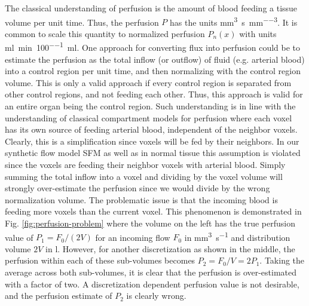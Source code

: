 \documentclass[paper=a4, fontsize=11pt,parskip=half,headings=small]{scrartcl}
\newcommand{\siqt}{\cubic\milli\meter\per\second}
\newcommand{\siP}{\cubic\milli\meter\per\second\per\cubic\milli\meter}
\newcommand{\siPn}{\milli\litre\per\minute\per100\milli\litre}
\begin{document}
	The classical understanding of perfusion is the amount of blood feeding a tissue volume per unit time. 
	Thus, the perfusion $P$ has the units \si{\siP}.
	It is common to scale this quantity to normalized perfusion $P_n(x)$ with units \si{\siPn}. 
	One approach for converting flux into perfusion could be to estimate the perfusion as the total inflow (or outflow) of fluid (e.g. arterial blood) into a control region per unit time, and then normalizing with the control region volume. 
	This is only a valid approach if every control region is separated from other control regions, and not feeding each other. 
	Thus, this approach is valid for an entire organ being the control region. 
	Such understanding is in line with the understanding of classical compartment models for perfusion where each voxel has its own source of feeding arterial blood, independent of the neighbor voxels. 
	Clearly, this is a simplification since voxels will be fed by their neighbors. 
	In our synthetic flow model SFM as well as in normal tissue this assumption is violated since the voxels are feeding their neighbor voxels with arterial blood. 
	Simply summing the total inflow into a voxel and dividing by the voxel volume will strongly over-estimate the perfusion since we would divide by the wrong normalization volume. 
	The problematic issue is that the incoming blood is feeding more voxels than the current voxel. 
	This phenomenon is demonstrated in Fig. \ref{fig:perfusion-problem} where the volume on the left has the true perfusion value of $P_1 = F_0/(2V)$ for an incoming flow $F_0$ in \si{\siqt} and distribution volume $2V$ in \si{\litre}. 
	However, for another discretization as shown in the middle, the perfusion within each of these sub-volumes becomes $P_2 = F_0/V = 2P_1$. 
	Taking the average across both sub-volumes, it is clear that the perfusion is over-estimated with a factor of two. 
	A discretization dependent perfusion value is not desirable, and the perfusion estimate of $P_2$ is clearly wrong. 
\end{document}
